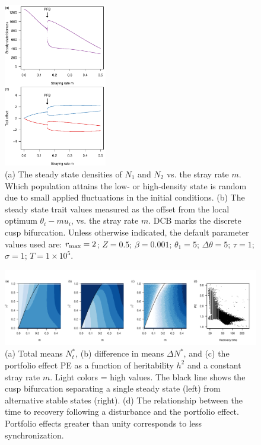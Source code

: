 \documentclass{revtex4}
\begin{document}
\begin{figure}
  \captionsetup{justification=raggedright,
singlelinecheck=false
}
\centering
\includegraphics[width=0.4\textwidth]{fig_traj.pdf}
\caption{
(a) The steady state densities of $N_1$ and $N_2$ vs. the stray rate $m$. Which population attains the low- or high-density state is random due to small applied fluctuations in the initial conditions.
(b) The steady state trait values measured as the offset from the local optimum $\theta_i - mu_i$, vs. the stray rate $m$. 
DCB marks the discrete cusp bifurcation.
Unless otherwise indicated, the default parameter values used are: $r_{\rm max}=2$; $Z=0.5$; $\beta=0.001$; $\theta_1=5$; $\Delta\theta=5$; $\tau=1$; $\sigma=1$; $T=1\times10^5$.
} \label{fig:traj}
\end{figure}

\begin{figure}
  \captionsetup{justification=raggedright,
singlelinecheck=false
}
\centering
\includegraphics[width=1\textwidth]{fig_MDPE_hm.pdf}
\caption{
(a) Total means $N_t^*$, 
(b) difference in means $\Delta N^*$, and 
(c) the portfolio effect PE as a function of heritability $h^2$ and a constant stray rate $m$. Light colors = high values.
The black line shows the cusp bifurcation separating a single steady state (left) from alternative stable states (right).
(d) The relationship between the time to recovery following a disturbance and the portfolio effect. Portfolio effects greater than unity corresponds to less synchronization.
} \label{fig:PE}
\end{figure}
\end{document}
